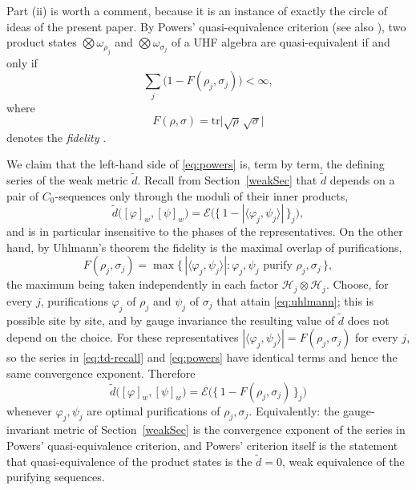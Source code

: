 \documentclass[twoside,11pt,letter]{article}
\def\cH{{\mathcal{H}}}
\newcommand{\tr}{\mathrm{tr}}
\newcommand{\cexp}{\mathcal{E}}  %
\theoremstyle{definition}
\theoremstyle{definition}
\theoremstyle{plain}
\begin{document}
Part (ii) is worth a comment, because it is an instance of exactly the circle of ideas of the present paper. By Powers' quasi-equivalence criterion \cite{P67} (see also \cite{AW68}), two product states $\bigotimes \omega_{\rho_j}$ and $\bigotimes \omega_{\sigma_j}$ of a UHF algebra are quasi-equivalent if and only if
\begin{equation}
\label{eq:powers}
\sum_j \bigl( 1 - F(\rho_j, \sigma_j) \bigr) < \infty,
\end{equation}
where
\begin{equation}
\label{eq:bures}
F(\rho, \sigma) = \tr \bigl| \sqrt{\rho}\,\sqrt{\sigma} \bigr|
\end{equation}
denotes the \emph{fidelity} \cite{U76, J94}.

We claim that the left-hand side of \eqref{eq:powers} is, term by term, the defining series of the weak metric $\tilde d$. Recall from Section~\ref{weakSec} that $\tilde d$ depends on a pair of $C_0$-sequences only through the moduli of their inner products,
\begin{equation}
\label{eq:td-recall}
\tilde d\bigl( [\varphi]_w, [\psi]_w \bigr)
= \cexp\bigl( \bigl\{\, 1 - |\langle \varphi_j, \psi_j \rangle| \,\bigr\}_j \bigr),
\end{equation}
and is in particular insensitive to the phases of the representatives. On the other hand, by Uhlmann's theorem the fidelity is the maximal overlap of purifications,
\begin{equation}
\label{eq:uhlmann}
F(\rho_j, \sigma_j)
= \max \bigl\{\, |\langle \varphi_j, \psi_j \rangle|:\varphi_j, \psi_j \text{ purify } \rho_j, \sigma_j \,\bigr\},
\end{equation}
the maximum being taken independently in each factor $\cH_j \otimes \cH_j$. Choose, for every $j$, purifications $\varphi_j$ of $\rho_j$ and $\psi_j$ of $\sigma_j$ that attain \eqref{eq:uhlmann}; this is possible site by site, and by gauge invariance the resulting value of $\tilde d$ does not depend on the choice. For these representatives $|\langle \varphi_j, \psi_j \rangle| = F(\rho_j, \sigma_j)$ for every $j$, so the series in \eqref{eq:td-recall} and \eqref{eq:powers} have identical terms and hence the same convergence exponent. Therefore
\begin{equation}
\label{eq:d-is-powers}
\boxed{\;
\tilde d \bigl( [\varphi]_w, [\psi]_w \bigr) = \cexp \bigl( \bigl\{\, 1 - F(\rho_j, \sigma_j) \,\bigr\}_j \bigr)
\;}
\end{equation}
whenever $\varphi_j, \psi_j$ are optimal purifications of $\rho_j, \sigma_j$. Equivalently: the gauge-invariant metric of Section~\ref{weakSec} is the convergence exponent of the series in Powers' quasi-equivalence criterion, and Powers' criterion itself is the statement that quasi-equivalence of the product states is the $\tilde d = 0$, weak equivalence of the purifying sequences.
\end{document}
